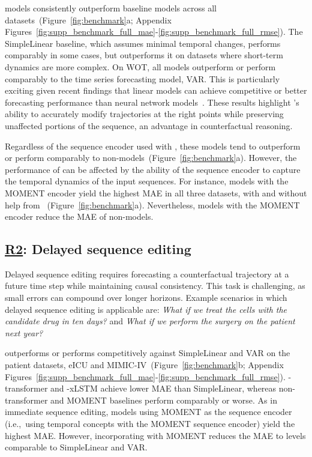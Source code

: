 \name models consistently outperform baseline models across all datasets~(Figure~\ref{fig:benchmark}a; Appendix Figures~\ref{fig:supp_benchmark_full_mae}-\ref{fig:supp_benchmark_full_rmse}). The SimpleLinear baseline, which assumes minimal temporal changes, performs comparably in some cases, but \name outperforms it on datasets where short-term dynamics are more complex. On WOT, all \name models outperform or perform comparably to the time series forecasting model, VAR. This is particularly exciting given recent findings that linear models can achieve competitive or better forecasting performance than neural network models~\cite{toner2024analysis, ahlmann2024deep}. These results highlight \name's ability to accurately modify trajectories at the right points while preserving unaffected portions of the sequence, an advantage in counterfactual reasoning.

Regardless of the sequence encoder used with \name, these models tend to outperform or perform comparably to non-\name models~(Figure~\ref{fig:benchmark}a). However, the performance of \name can be affected by the ability of the sequence encoder to capture the temporal dynamics of the input sequences. For instance, models with the MOMENT encoder yield the highest MAE in all three datasets, with and without help from \name~(Figure~\ref{fig:benchmark}a). Nevertheless, \name models with the MOMENT encoder reduce the MAE of non-\name models.


\subsection{\underline{R2}: Delayed sequence editing}\label{results:r2}


Delayed sequence editing requires forecasting a counterfactual trajectory at a future time step while maintaining causal consistency. This task is challenging, as small errors can compound over longer horizons. Example scenarios in which delayed sequence editing is applicable are: \textit{What if we treat the cells with the candidate drug in ten days?} and \textit{What if we perform the surgery on the patient next year?}

\name outperforms or performs competitively against SimpleLinear and VAR on the patient datasets, eICU and MIMIC-IV~(Figure~\ref{fig:benchmark}b; Appendix Figures~\ref{fig:supp_benchmark_full_mae}-\ref{fig:supp_benchmark_full_rmse}). \name-transformer and \name-xLSTM achieve lower MAE than SimpleLinear, whereas non-\name transformer and MOMENT baselines perform comparably or worse. As in immediate sequence editing, models using MOMENT as the sequence encoder (i.e.,~using temporal concepts with the MOMENT sequence encoder) yield the highest MAE. However, incorporating \name with MOMENT reduces the MAE to levels comparable to SimpleLinear and VAR.


